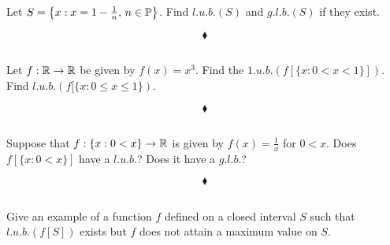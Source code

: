 \subsection{}
\begin{tcolorbox}
Let $S = \left\{x:x=1-\frac{1}{n},\, n\in\mathbb{P}\right\}$. Find $l.u.b. (S)$ and $g.l.b. (S)$ if they exist. 
\end{tcolorbox}

$$\blacklozenge$$

\subsection{}
\begin{tcolorbox}
Let $f:\mathbb{R}\rightarrow \mathbb{R}$  be given by $f (x)=x^3$. Find the $1.u.b. (f [\{x: 0 < x < 1\}])$. \\
Find $l.u.b. (f [\{x:0\leq x\leq 1\})$. 
\end{tcolorbox}

$$\blacklozenge$$

\subsection{}
\begin{tcolorbox}
Suppose that $f: \{x :0 < x\}\rightarrow\mathbb{R}$ is given by $f (x)= \frac{1}{x}$  for $0 < x$. Does $f [\{x : 0 < x\}]$ have a $l.u.b.$? Does it have a $g.l.b.$? 
\end{tcolorbox}

$$\blacklozenge$$

\subsection{}
\begin{tcolorbox}
Give an example of a function $f$ defined on a closed interval $S$ such that $l.u.b. (f [S])$ exists but $f$ does not attain a maximum value on $S$.
\end{tcolorbox}

